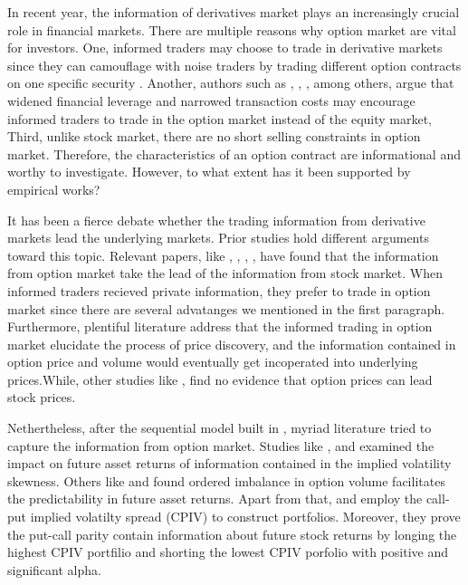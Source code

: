 
In recent year, the information of derivatives market plays an increasingly crucial role in financial markets. There are multiple reasons why option market are vital for investors. One, informed traders may choose to trade in derivative markets since they can camouflage with noise traders by trading different option contracts on one specific security \parencite{easley1998option}. Another, authors such as \textcite{black1973pricing}, \textcite{mayhew1995allocation}, \textcite{fleming1996trading}, among others, argue that widened financial leverage and narrowed transaction costs may encourage informed traders to trade in the option market instead of the equity market,
Third, unlike stock market, there are no short selling constraints in option market. Therefore, the characteristics of an option contract are informational and worthy to investigate. However, to what extent has it been supported by empirical works? 

It has been a fierce debate whether the trading information from derivative markets lead the underlying markets. Prior studies hold different arguments toward this topic. Relevant papers, like \textcite{manaster1982option}, \textcite{anthony1988interrelation}, \textcite{chakravarty2004informed}, \textcite{cremers2010deviations}, \textcite{xing2010does} have found that the information from option market take the lead of the information from stock market. When informed traders recieved private information, they prefer to trade in option market since there are several advatanges we mentioned in the first paragraph. Furthermore, plentiful literature address that the informed trading in option market elucidate the process of price discovery, and the information contained in option price and volume would eventually get incoperated into underlying prices.While, other studies like \textcite{chan1993option}, \textcite{stephan1990intraday} find no evidence that option prices can lead stock prices. 

Nethertheless, after the sequential model built in \textcite{easley1998option}, myriad literature tried to capture the information from option market. Studies like \textcite{doran2007there}, \textcite{doran2010implications} and \textcite{atilgan2015implied} examined the impact on future asset returns of information contained in the implied volatility skewness. Others like \textcite{chan2002informational} and \textcite{pan2006information} found ordered imbalance in option volume facilitates the predictability in future asset returns. Apart from that, \textcite{bali2009volatility} and \textcite{cremers2010deviations} employ the call-put implied volatilty spread (CPIV) to construct portfolios. Moreover, they prove the put-call parity contain information about future stock returns by longing the highest CPIV portfilio and shorting the lowest CPIV porfolio with positive and significant alpha.   

